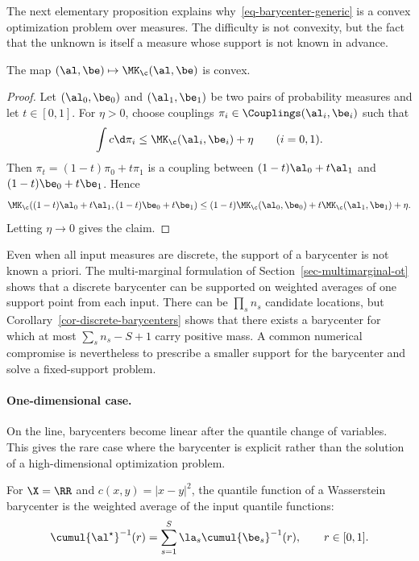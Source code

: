 The next elementary proposition explains why~\eqref{eq-barycenter-generic} is a convex optimization problem over measures. The difficulty is not convexity, but the fact that the unknown is itself a measure whose support is not known in advance.

\begin{prop}\label{prop-barycenter-ot-cost-convexity}
	The map $(\al,\be)\mapsto\MK_\c(\al,\be)$ is convex.
\end{prop}

\begin{proof}
	Let $(\al_0,\be_0)$ and $(\al_1,\be_1)$ be two pairs of probability measures and let $t\in[0,1]$. For $\eta>0$, choose couplings $\pi_i\in\Couplings(\al_i,\be_i)$ such that
	\[
		\int c\d\pi_i\leq\MK_\c(\al_i,\be_i)+\eta
		\qquad (i=0,1).
	\]
	Then $\pi_t=(1-t)\pi_0+t\pi_1$ is a coupling between $(1-t)\al_0+t\al_1$ and $(1-t)\be_0+t\be_1$. Hence
	\[
		\MK_\c((1-t)\al_0+t\al_1,(1-t)\be_0+t\be_1)
		\leq
		(1-t)\MK_\c(\al_0,\be_0)+t\MK_\c(\al_1,\be_1)+\eta.
	\]
	Letting $\eta\to0$ gives the claim.
\end{proof}

Even when all input measures are discrete, the support of a barycenter is not known a priori. The multi-marginal formulation of Section~\ref{sec-multimarginal-ot} shows that a discrete barycenter can be supported on weighted averages of one support point from each input. There can be $\prod_s n_s$ candidate locations, but Corollary~\ref{cor-discrete-barycenters} shows that there exists a barycenter for which at most $\sum_s n_s-S+1$ carry positive mass. A common numerical compromise is nevertheless to prescribe a smaller support for the barycenter and solve a fixed-support problem.

\paragraph{One-dimensional case.}

On the line, barycenters become linear after the quantile change of variables. This gives the rare case where the barycenter is explicit rather than the solution of a high-dimensional optimization problem.

\begin{prop}\label{prop-quantile-barycenters}
	For $\X=\RR$ and $c(x,y)=|x-y|^2$, the quantile function of a Wasserstein barycenter is the weighted average of the input quantile functions:
	\[
		\cumul{\al^\star}^{-1}(r)
		=
		\sum_{s=1}^S\la_s\cumul{\be_s}^{-1}(r),
		\qquad r\in[0,1].
	\]
\end{prop}

